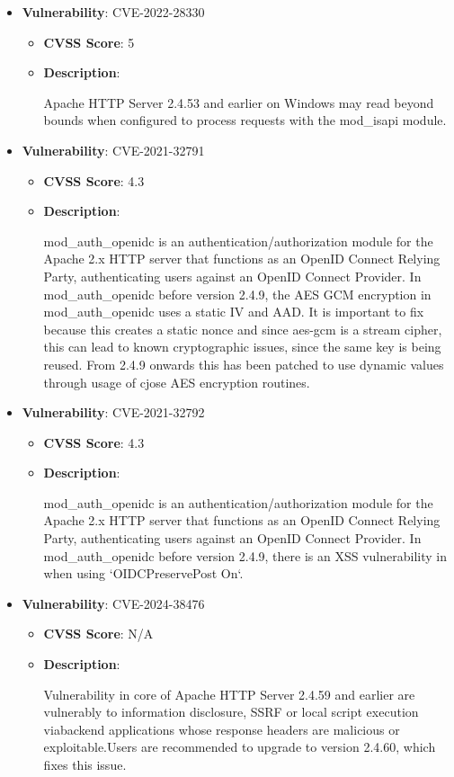 \documentclass{article}
\begin{document}
\begin{itemize}
        \item \textbf{Vulnerability}: CVE-2022-28330
        \begin{itemize}
            \item \textbf{CVSS Score}:  5 
            \item \textbf{Description}:
            \parbox[t]{0.9\linewidth}{
                \ttfamily Apache HTTP Server 2.4.53 and earlier on Windows may read beyond bounds when configured to process requests with the mod\_isapi module.
            }
        \end{itemize}
    
        \item \textbf{Vulnerability}: CVE-2021-32791
        \begin{itemize}
            \item \textbf{CVSS Score}:  4.3 
            \item \textbf{Description}:
            \parbox[t]{0.9\linewidth}{
                \ttfamily mod\_auth\_openidc is an authentication/authorization module for the Apache 2.x HTTP server that functions as an OpenID Connect Relying Party, authenticating users against an OpenID Connect Provider. In mod\_auth\_openidc before version 2.4.9, the AES GCM encryption in mod\_auth\_openidc uses a static IV and AAD. It is important to fix because this creates a static nonce and since aes-gcm is a stream cipher, this can lead to known cryptographic issues, since the same key is being reused. From 2.4.9 onwards this has been patched to use dynamic values through usage of cjose AES encryption routines.
            }
        \end{itemize}
    
        \item \textbf{Vulnerability}: CVE-2021-32792
        \begin{itemize}
            \item \textbf{CVSS Score}:  4.3 
            \item \textbf{Description}:
            \parbox[t]{0.9\linewidth}{
                \ttfamily mod\_auth\_openidc is an authentication/authorization module for the Apache 2.x HTTP server that functions as an OpenID Connect Relying Party, authenticating users against an OpenID Connect Provider. In mod\_auth\_openidc before version 2.4.9, there is an XSS vulnerability in when using `OIDCPreservePost On`.
            }
        \end{itemize}
    
        \item \textbf{Vulnerability}: CVE-2024-38476
        \begin{itemize}
            \item \textbf{CVSS Score}:  N/A 
            \item \textbf{Description}:
            \parbox[t]{0.9\linewidth}{
                \ttfamily Vulnerability in core of Apache HTTP Server 2.4.59 and earlier are vulnerably to information disclosure, SSRF or local script execution viabackend applications whose response headers are malicious or exploitable.Users are recommended to upgrade to version 2.4.60, which fixes this issue.
            }
        \end{itemize}
    

\end{itemize}
\end{document}
